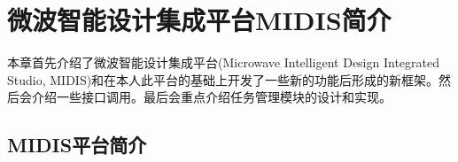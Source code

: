 \section{微波智能设计集成平台MIDIS简介}

本章首先介绍了微波智能设计集成平台(Microwave Intelligent Design Integrated Studio, MIDIS)和在本人此平台的基础上开发了一些新的功能后形成的新框架。然后会介绍一些接口调用。最后会重点介绍任务管理模块的设计和实现。

\subsection{MIDIS平台简介}
